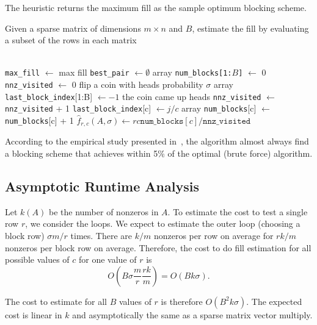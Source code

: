 The heuristic returns the maximum fill as the sample optimum blocking scheme.

 \begin{samepage}
    \begin{alg}
      Given a sparse matrix of dimensions $m \times n$ and $B$, estimate the fill by evaluating a subset of the rows in each matrix
      \begin{algorithmic}[1]
         \\
       \State \texttt{max\_fill} $\gets$ max fill
       \State \texttt{best\_pair} $\gets \emptyset$
          \State array \texttt{num\_blocks[1:$B$]} $\gets$ 0
          \State \texttt{nnz\_visited} $\gets$ 0
          \State flip a coin with heads probability $\sigma$
          \State array \texttt{last\_block\_index}[1:B] $\gets -1$
          \If the coin came up heads
          \State \texttt{nnz\_visited} $\gets$ \texttt{nnz\_visited} + 1
          \State \texttt{last\_block\_index}[c] $\gets j/c$
          \State array \texttt{num\_blocks}[c] $\gets$ \texttt{num\_blocks}[c] + 1
          \EndFor
          \EndFor
          \EndIf
          \EndFor
          \State $\hat{f}_{r,c}(A, \sigma) \gets rc\texttt{num\_blocks}[c]  /  \texttt{nnz\_visited} $
          \EndFor
        \EndFunction
      \end{algorithmic}
      \label{alg:oski}
    \end{alg}
    \end{samepage}

According to the empirical study presented in~\cite{vuduc04}, the algorithm almost always find a blocking
scheme that achieves within 5\% of the optimal (brute force) algorithm. 

\subsection{Asymptotic Runtime Analysis}
Let $k(A)$ be the number of nonzeros in $A$. To estimate the cost to test a single row $r$, we consider the loops.
We expect to estimate the outer loop (choosing a block row) $\sigma m/r$ times. There are $k/m$ nonzeros
per row on average for $rk/m$ nonzeros per block row on average. Therefore, the cost to do fill 
estimation for all possible values of $c$ for one value of $r$ is $$O\left(B\sigma \frac{m}{r} \frac{rk}{m}\right) = O(Bk\sigma). $$

The cost to estimate for all $B$ values of $r$ is therefore $O(B^2k\sigma).$ The expected cost is
linear in $k$ and asymptotically the same as a sparse matrix vector multiply.